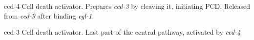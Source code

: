 \begin{flashcard}{ced-4}
    Cell death activator. Prepares \textit{ced-3} by cleaving it, initiating PCD. Released from \textit{ced-9} after binding \textit{egl-1}
\end{flashcard}

\begin{flashcard}{ced-3}
    Cell death activator. Last part of the central pathway, activated by \textit{ced-4}
\end{flashcard}
